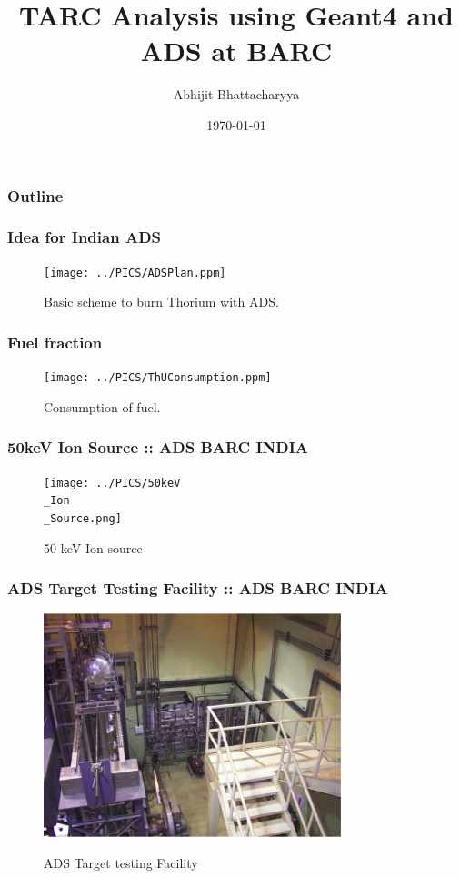\documentclass{beamer}
\title{TARC Analysis using Geant4 and ADS at BARC}
\author{Abhijit Bhattacharyya}
\institute{Bhabha Atomic Research Center \\ Mumbai INDIA}
\date{\today}
\begin{document}
    \begin{frame}
        \maketitle
    \end{frame}
    
    \begin{frame}
        \frametitle{Outline}
        \tableofcontents [part=1, pausesections]
    \end{frame}

    \begin{frame}
      \frametitle{Idea for Indian ADS}
      \begin{figure}
        \texttt{[image: ../PICS/ADSPlan.ppm]}
        \label{fig:ADSPlan}
        \caption{Basic scheme to burn Thorium with ADS.}
      \end{figure}
    \end{frame}

    
    \begin{frame}
      \frametitle{Fuel fraction}
      \begin{figure}
        \texttt{[image: ../PICS/ThUConsumption.ppm]}
        \label{fig:ADSPlan}
        \caption{Consumption of fuel.}
      \end{figure}
    \end{frame}
    
    
    \begin{frame}
      \frametitle{50keV Ion Source :: ADS BARC INDIA}
      \begin{figure}
        \texttt{[image: ../PICS/50keV\\\_Ion\\\_Source.png]}
        \label{fig:50keVionSource}
        \caption{50 keV Ion source}
      \end{figure}
    \end{frame}

    \begin{frame}
      \frametitle{ADS Target Testing Facility :: ADS BARC INDIA}
      \begin{figure}
        \includegraphics[height=65mm, width=100m]{../PICS/ADS_Target_Testing_Facility.png}
        \label{fig:ADSTARGET}
        \caption{ADS Target testing Facility}
      \end{figure}
    \end{frame}
\end{document}

